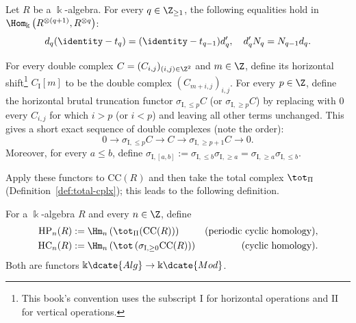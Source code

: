 \begin{lemma}\label{prop:CC-cplx}
	Let $R$ be a $\Bbbk$-algebra. For every $q\in\Z_{\geq1}$, the following
	equalities hold in
	$\Hom_{\Bbbk}\left(R^{\otimes(q+1)},R^{\otimes q}\right)$:
	\[ d_q(\identity-t_q)=(\identity-t_{q-1})d'_q,
		\quad d'_qN_q=N_{q-1}d_q. \]
\end{lemma}

For every double complex $C=(C_{i,j})_{(i,j)\in\Z^2}$ and $m\in\Z$,
define its horizontal shift\footnote{This book's convention uses the
subscript $\mathrm{I}$ for horizontal operations and $\mathrm{II}$ for
vertical operations.} $C_{\mathrm{I}}[m]$ to be the double complex
$(C_{m+i,j})_{i,j}$. For every $p\in\Z$, define the horizontal brutal
truncation functor $\sigma_{\mathrm{I},\leq p}C$ (or
$\sigma_{\mathrm{I},\geq p}C$) by replacing with $0$ every $C_{i,j}$ for
which $i>p$ (or $i<p$) and leaving all other terms unchanged. This gives a
short exact sequence of double complexes (note the order):
\begin{equation}\label{eqn:homology-I-brute-truncation}
	0 \to \sigma_{\mathrm{I}, \leq p} C \to C
	\to \sigma_{\mathrm{I}, \geq p+1} C \to 0.
\end{equation}
Moreover, for every $a\leq b$, define
$\sigma_{\mathrm{I},[a,b]}:=
\sigma_{\mathrm{I},\leq b}\sigma_{\mathrm{I},\geq a}
=\sigma_{\mathrm{I},\geq a}\sigma_{\mathrm{I},\leq b}$.


Apply these functors to $\mathrm{CC}(R)$ and then take the total complex
$\tot_{\Pi}$ (Definition~\ref{def:total-cplx}); this leads to the following
definition.

\begin{definition}\label{def:HC}
	For a $\Bbbk$-algebra $R$ and every $n\in\Z$, define
	\begin{align*}
		\mathrm{HP}_n(R)
		&:=\Hm_n\left(\tot_{\Pi}(\mathrm{CC}(R))\right)
		&\text{(periodic cyclic homology)},\\
		\mathrm{HC}_n(R)
		&:=\Hm_n\left(
		\tot\left(\sigma_{\mathrm{I},\geq0}\mathrm{CC}(R)\right)\right)
		&\text{(cyclic homology)}.
	\end{align*}
	Both are functors $\Bbbk\dcate{Alg}\to\Bbbk\dcate{Mod}$.
\end{definition}

